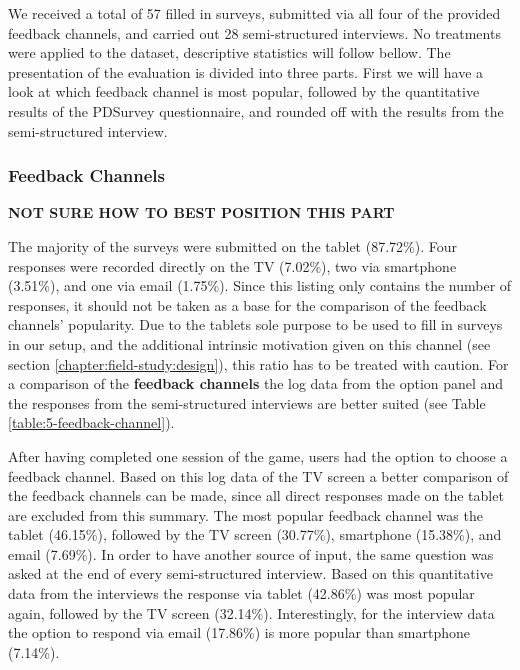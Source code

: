 	We received a total of 57 filled in surveys, submitted via all four of the provided feedback channels, and carried out 28 semi-structured interviews. 
	No treatments were applied to the dataset, descriptive statistics will follow bellow. The presentation of the evaluation is divided into three parts. First we will have a look at which feedback channel is most popular, followed by the quantitative results of the PDSurvey questionnaire, and rounded off with the results from the semi-structured interview. 



	\subsubsection{Feedback Channels}
	\label{5:results:feedback-channels}
	\label{5:results:feedback-channel}

	\textbf{NOT SURE HOW TO BEST POSITION THIS PART}

	The majority of the surveys were submitted on the tablet (87.72\%). Four responses were recorded directly on the TV (7.02\%), two via smartphone (3.51\%), and one via email (1.75\%). Since this listing only contains the number of responses, it should not be taken as a base for the comparison of the feedback channels' popularity. %
	Due to the tablets sole purpose to be used to fill in surveys in our setup, and the additional intrinsic motivation given on this channel (see section \ref{chapter:field-study:design}), this ratio has to be treated with caution. For a comparison of the \textbf{feedback channels} the log data from the option panel and the responses from the semi-structured interviews are better suited (see Table \ref{table:5-feedback-channel}).


	After having completed one session of the game, users had the option to choose a feedback channel. Based on this log data of the TV screen a better comparison of the feedback channels can be made, since all direct responses made on the tablet are excluded from this summary. The most popular feedback channel was the tablet (46.15\%), followed by the TV screen (30.77\%), smartphone (15.38\%), and email (7.69\%).
	In order to have another source of input, the same question was asked at the end of every semi-structured interview. Based on this quantitative data from the interviews the response via tablet (42.86\%) was most popular again, followed by the TV screen (32.14\%). Interestingly, for the interview data the option to respond via email (17.86\%) is more popular than smartphone (7.14\%). 
		
